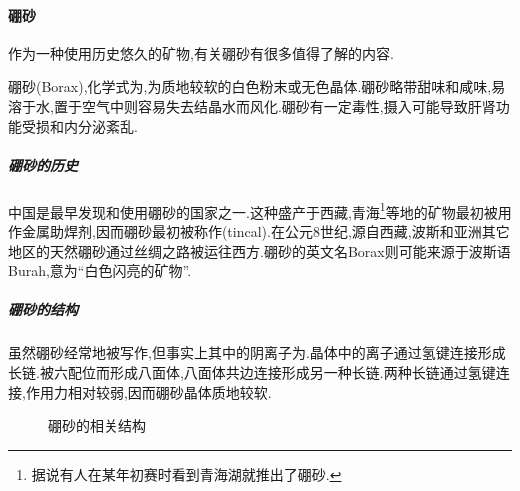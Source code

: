 \documentclass{ctexart}
\begin{document}
\paragraph{硼砂}
作为一种使用历史悠久的矿物,有关硼砂有很多值得了解的内容.
\begin{substance}[\ce{Na2B4O7.10H2O}]
    硼砂(Borax),化学式为,为质地较软的白色粉末或无色晶体.硼砂略带甜味和咸味,易溶于水,置于空气中则容易失去结晶水而风化.硼砂有一定毒性,摄入可能导致肝肾功能受损和内分泌紊乱.
\end{substance}
\subparagraph{硼砂的历史}
中国是最早发现和使用硼砂的国家之一.这种盛产于西藏,青海\footnote{据说有人在某年初赛时看到青海湖就推出了硼砂.}等地的矿物最初被用作金属助焊剂,因而硼砂最初被称作(tincal).在公元8世纪,源自西藏,波斯和亚洲其它地区的天然硼砂通过丝绸之路被运往西方.硼砂的英文名Borax则可能来源于波斯语Burah,意为“白色闪亮的矿物”.
\subparagraph{硼砂的结构}
虽然硼砂经常地被写作,但事实上其中的阴离子为.晶体中的离子通过氢键连接形成长链.被六配位而形成八面体,八面体共边连接形成另一种长链.两种长链通过氢键连接,作用力相对较弱,因而硼砂晶体质地较软.
\begin{figure}[H]
    \centering
    \caption{硼砂的相关结构}
\end{figure}
\end{document}
